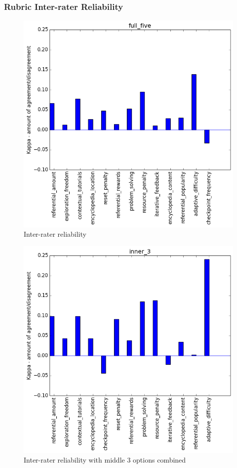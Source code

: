 		\subsubsection{Rubric Inter-rater Reliability}
			\begin{figure}[h] 
				\centering 
				\includegraphics[height=0.33\textheight]{full_five_stats.png} 
				\caption{Inter-rater reliability}
			\end{figure}
			\begin{figure}[h] 
				\centering 
				\includegraphics[height=0.33\textheight]{inner_3_stats.png} 
				\caption{Inter-rater reliability with middle 3 options combined}
			\end{figure}
